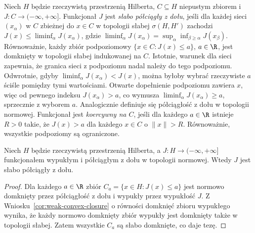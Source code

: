 \begin{definicja}
\label{def:weak-lsc16}
Niech $H$ będzie rzeczywistą przestrzenią Hilberta,
$C\subseteq H$ niepustym zbiorem i $J:C\to(-\infty,+\infty]$.
Funkcjonał $J$ jest \emph{słabo półciągły z dołu}, jeśli dla każdej sieci
$(x_\alpha)$ w $C$ zbieżnej do $x\in C$ w topologii
słabej $\sigma(H,H')$ zachodzi
$J(x)\le\liminf_\alpha J(x_\alpha)$, gdzie
$\liminf_\alpha J(x_\alpha)=
\sup_\alpha\inf_{\beta\ge\alpha}J(x_\beta)$.
Równoważnie, każdy zbiór podpoziomowy
$\{x\in C:J(x)\le a\}$, $a\in\R$, jest domknięty
w topologii słabej indukowanej na $C$.
Istotnie, warunek dla sieci zapewnia, że granica sieci
z podpoziomu nadal należy do tego podpoziomu.
Odwrotnie, gdyby $\liminf_\alpha J(x_\alpha)<J(x)$,
można byłoby wybrać rzeczywiste $a$ ściśle pomiędzy
tymi wartościami. Otwarte dopełnienie podpoziomu
zawiera $x$, więc od pewnego indeksu $J(x_\alpha)>a$,
co wymusza $\liminf_\alpha J(x_\alpha)\ge a$,
sprzecznie z wyborem $a$.
Analogicznie definiuje się półciągłość z dołu
w topologii normowej.
Funkcjonał jest \emph{koercywny na $C$}, jeśli dla
każdego $a\in\R$ istnieje $R>0$ takie, że
$J(x)>a$ dla każdego $x\in C$ o $\|x\|>R$.
Równoważnie, wszystkie podpoziomy są ograniczone.
\end{definicja}

\begin{lemat}
\label{lem:convex-weaklsc16}
Niech $H$ będzie rzeczywistą przestrzenią Hilberta,
a $J:H\to(-\infty,+\infty]$ funkcjonałem wypukłym
i półciągłym z dołu w topologii normowej.
Wtedy $J$ jest słabo półciągły z dołu.
\end{lemat}
\begin{proof}
Dla każdego $a\in\R$ zbiór $C_a=\{x\in H:J(x)\le a\}$
jest normowo domknięty przez półciągłość z dołu
i wypukły przez wypukłość $J$. Z Wniosku~\ref{cor:weak-convex-closure}
o równości domknięć zbioru wypukłego wynika,
że każdy normowo domknięty zbiór wypukły jest
domknięty także w topologii słabej. Zatem wszystkie $C_a$
są słabo domknięte, co daje tezę.
\end{proof}


